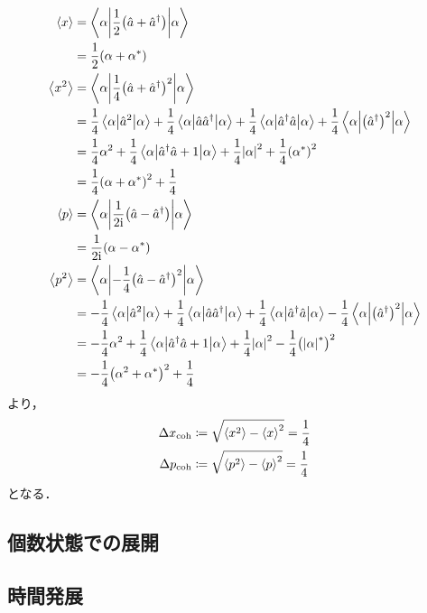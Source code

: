 \documentclass{report}
\begin{document}
    \begin{align}
      \ev{x} &= \mel**{\alpha}{\frac{1}{2}\qty(\hat{a} + \hat{a}^{\dag})}{\alpha} \\ 
      &= \frac{1}{2}\qty(\alpha + \alpha^*) \\ 
      \ev{x^2} &= \mel**{\alpha}{\frac{1}{4}\qty(\hat{a} + \hat{a}^{\dag})^2}{\alpha} \\ 
      &= \frac{1}{4}\mel**{\alpha}{\hat{a}^2}{\alpha} + \frac{1}{4}\mel**{\alpha}{\hat{a}\hat{a}^{\dag}}{\alpha} + \frac{1}{4}\mel**{\alpha}{\hat{a}^{\dag}\hat{a}}{\alpha} + \frac{1}{4}\mel**{\alpha}{\qty(\hat{a}^{\dag})^2}{\alpha} \\ 
      &= \frac{1}{4}\alpha^2 + \frac{1}{4}\mel**{\alpha}{\hat{a}^{\dag}\hat{a} + 1}{\alpha} + \frac{1}{4}\abs{\alpha}^2 + \frac{1}{4}\qty(\alpha^*)^2 \\ 
      &= \frac{1}{4}\qty(\alpha + \alpha^*)^2 + \frac{1}{4} \\ 
      \ev{p} &= \mel**{\alpha}{\frac{1}{2\i}\qty(\hat{a} - \hat{a}^{\dag})}{\alpha} \\ 
      &= \frac{1}{2\i}\qty(\alpha - \alpha^*) \\ 
      \ev{p^2} &= \mel**{\alpha}{-\frac{1}{4}\qty(\hat{a} - \hat{a}^{\dag})^2}{\alpha} \\ 
      &= -\frac{1}{4}\mel**{\alpha}{\hat{a}^2}{\alpha} + \frac{1}{4}\mel**{\alpha}{\hat{a}\hat{a}^{\dag}}{\alpha} + \frac{1}{4}\mel**{\alpha}{\hat{a}^{\dag}\hat{a}}{\alpha} - \frac{1}{4}\mel**{\alpha}{\qty(\hat{a}^{\dag})^2}{\alpha} \\ 
      &= -\frac{1}{4}\alpha^2 + \frac{1}{4}\mel**{\alpha}{\hat{a}^{\dag}\hat{a} + 1}{\alpha} + \frac{1}{4}\abs{\alpha}^2 - \frac{1}{4}\qty(\abs{\alpha}^{*})^2 \\ 
      &= -\frac{1}{4}\qty(\alpha^2 + \alpha^*)^2 + \frac{1}{4}
    \end{align}
    より，
    \begin{align}
      \Delta x_{\r{coh}} &\coloneqq \sqrt{\ev{x^2} - \ev{x}^2} = \frac{1}{4} \\ 
      \Delta p_{\r{coh}} &\coloneqq \sqrt{\ev{p^2} - \ev{p}^2} = \frac{1}{4}
    \end{align}
    となる．
  \subsection{個数状態での展開}
  \subsection{時間発展}
\end{document}
